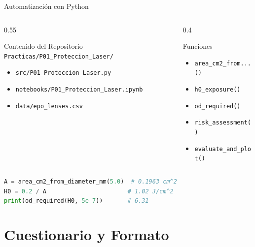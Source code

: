 \documentclass[aspectratio=169,12pt]{beamer}
\begin{document}
\begin{frame}[fragile]{Automatización con Python}
	\begin{columns}
		\begin{column}{0.55\textwidth}
			\begin{block}{Contenido del Repositorio}
				\texttt{Practicas/P01\_Proteccion\_Laser/}
				\begin{itemize}
					\item \texttt{src/P01\_Proteccion\_Laser.py}
					\item \texttt{notebooks/P01\_Proteccion\_Laser.ipynb}
					\item \texttt{data/epo\_lenses.csv}
				\end{itemize}
			\end{block}
		\end{column}
		\begin{column}{0.4\textwidth}
			\begin{exampleblock}{Funciones}
				\begin{itemize}
					\item \texttt{area\_cm2\_from...()}
					\item \texttt{h0\_exposure()}
					\item \texttt{od\_required()}
					\item \texttt{risk\_assessment()}
					\item \texttt{evaluate\_and\_plot()}
				\end{itemize}
			\end{exampleblock}
		\end{column}
	\end{columns}

	\vspace{0.3cm}
	\begin{lstlisting}[language=Python]
A = area_cm2_from_diameter_mm(5.0)  # 0.1963 cm^2
H0 = 0.2 / A                       # 1.02 J/cm^2
print(od_required(H0, 5e-7))       # 6.31
  \end{lstlisting}
\end{frame}

\section{Cuestionario y Formato}
\end{document}
